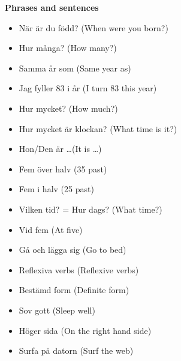 
\begin{flushleft}
    \textbf{Phrases and sentences}
    \begin{itemize}
        \item När är du född? (When were you born?)
        \item Hur många? (How many?)
        \item Samma år som (Same year as)
        \item Jag fyller 83 i år (I turn 83 this year)
        \item Hur mycket? (How much?)
        \item Hur mycket är klockan? (What time is it?)
        \item Hon/Den är \ldots (It is \ldots)
        \item Fem över halv (35 past)
        \item Fem i halv (25 past)
        \item Vilken tid? = Hur dags? (What time?)
        \item Vid fem (At five)
        \item Gå och lägga sig (Go to bed)
        \item Reflexiva verbs (Reflexive verbs)
        \item Bestämd form (Definite form)
        \item Sov gott (Sleep well)
        \item Höger sida (On the right hand side)
        \item Surfa på datorn (Surf the web)
    \end{itemize}
\end{flushleft}


